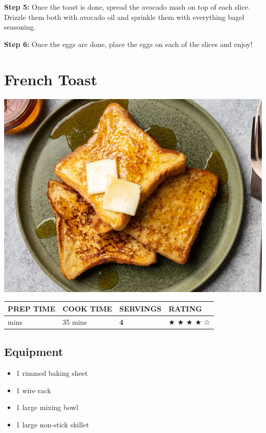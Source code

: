 \documentclass[
]{book}
\providecommand{\tightlist}{%
  \setlength{\itemsep}{0pt}\setlength{\parskip}{0pt}}
\begin{document}
\textbf{Step 5:} Once the toast is done, spread the avocado mash on top
of each slice. Drizzle them both with avocado oil and sprinkle them with
everything bagel seasoning.

\textbf{Step 6:} Once the eggs are done, place the eggs on each of the
slices and enjoy!

\section*{French Toast}\label{french-toast}

\includegraphics{ft.jpg}

\begin{longtable}[]{@{}llll@{}}
\toprule\noalign{}
\textbf{PREP TIME} & \textbf{COOK TIME} & \textbf{SERVINGS} &
\textbf{RATING} \\
\midrule\noalign{}
\endhead
\bottomrule\noalign{}
\endlastfoot
5 mins & 35 mins & \textbf{4} & ★ ★ ★ ★ ☆ \\
\end{longtable}

\subsection*{Equipment}\label{equipment-1}

\begin{itemize}
\tightlist
\item
  1 rimmed baking sheet
\item
  1 wire rack
\item
  1 large mixing bowl
\item
  1 large non-stick skillet
\end{itemize}
\end{document}
